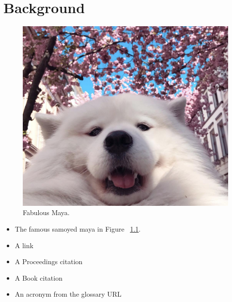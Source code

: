 \chapter{Background}
\label{sec:background}

\begin{figure}[t]
	\includegraphics[width=\textwidth]{fig/mayablossoms.png}
	\caption{Fabulous Maya.}
	\label{fig:maya}
\end{figure}
\begin{itemize}
    \item The famous samoyed maya in Figure ~\ref{fig:maya}.
    \item A link \cite{mayapolarbear}
    \item A Proceedings citation \cite{kiczales-1997-aop}
    \item A Book citation \cite{lamport-1994-ladps}
    \item An acronym from the glossary \ac{URL}
\end{itemize}
